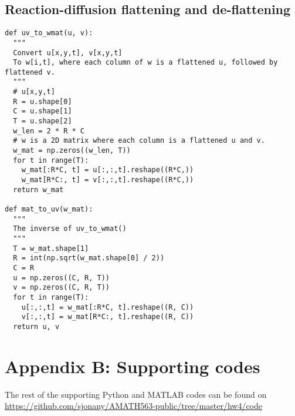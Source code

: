 \documentclass[letterpaper, 10 pt, conference]{ieeeconf}  %
\begin{document}
\subsection*{Reaction-diffusion flattening and de-flattening}
\begin{verbatim}
def uv_to_wmat(u, v):
  """
  Convert u[x,y,t], v[x,y,t]
  To w[i,t], where each column of w is a flattened u, followed by flattened v.
  """
  # u[x,y,t]
  R = u.shape[0]
  C = u.shape[1]
  T = u.shape[2]
  w_len = 2 * R * C
  # w is a 2D matrix where each column is a flattened u and v.
  w_mat = np.zeros((w_len, T))
  for t in range(T):
    w_mat[:R*C, t] = u[:,:,t].reshape((R*C,))
    w_mat[R*C:, t] = v[:,:,t].reshape((R*C,))
  return w_mat

def mat_to_uv(w_mat): 
  """
  The inverse of uv_to_wmat()
  """
  T = w_mat.shape[1]
  R = int(np.sqrt(w_mat.shape[0] / 2))
  C = R
  u = np.zeros((C, R, T))
  v = np.zeros((C, R, T))
  for t in range(T):
    u[:,:,t] = w_mat[:R*C, t].reshape((R, C))
    v[:,:,t] = w_mat[R*C:, t].reshape((R, C))
  return u, v
\end{verbatim}

\section*{Appendix B: Supporting codes}
The rest of the supporting Python and MATLAB codes can be found on \url{https://github.com/sjonany/AMATH563-public/tree/master/hw4/code}
\end{document}
